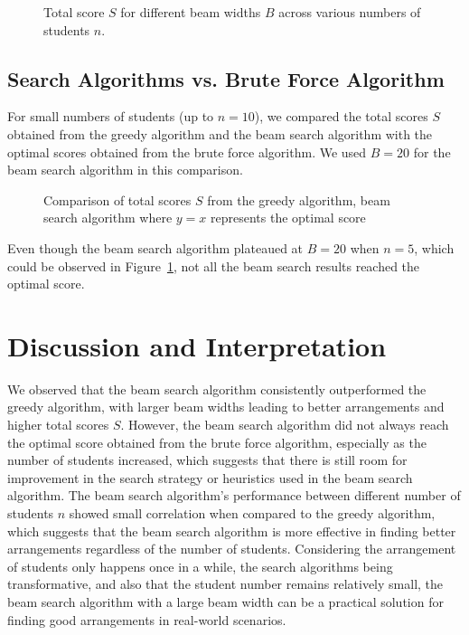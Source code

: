 \documentclass[11pt]{article}
\begin{document}
\begin{figure}[H]
    \centering
    \scalebox{0.7}{}
    \caption{Total score $S$ for different beam widths $B$ across various numbers of students $n$.}
    \label{fig:beam_width_comparison}
\end{figure}

\subsection{Search Algorithms vs. Brute Force Algorithm}

For small numbers of students (up to $n=10$), we compared the total scores $S$ obtained from the greedy algorithm and the beam search algorithm with the optimal scores obtained from the brute force algorithm.
We used $B=20$ for the beam search algorithm in this comparison.

\begin{figure}[H]
    \centering
    \scalebox{0.75}{}
    \caption{Comparison of total scores $S$ from the greedy algorithm, beam search algorithm where $y=x$ represents the optimal score}
    \label{fig:optimal_comparison}
\end{figure}

Even though the beam search algorithm plateaued at $B=20$ when $n=5$, which could be observed in Figure~\ref{fig:beam_width_comparison}, not all the beam search results reached the optimal score.

\section{Discussion and Interpretation}

We observed that the beam search algorithm consistently outperformed the greedy algorithm, with larger beam widths leading to better arrangements and higher total scores $S$.
However, the beam search algorithm did not always reach the optimal score obtained from the brute force algorithm, especially as the number of students increased, which suggests that there is still room for improvement in the search strategy or heuristics used in the beam search algorithm.
The beam search algorithm's performance between different number of students $n$ showed small correlation when compared to the greedy algorithm, which suggests that the beam search algorithm is more effective in finding better arrangements regardless of the number of students.
Considering the arrangement of students only happens once in a while, the search algorithms being transformative, and also that the student number remains relatively small, the beam search algorithm with a large beam width can be a practical solution for finding good arrangements in real-world scenarios.
\end{document}
